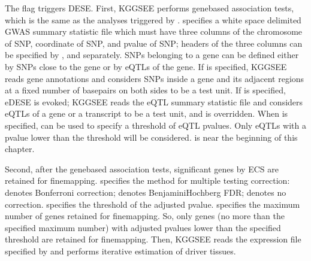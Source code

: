 \documentclass[letterpaper,10pt,english,openany,oneside]{sphinxmanual}
\begin{document}
\sphinxAtStartPar
The flag  triggers DESE. First, KGGSEE performs gene\sphinxhyphen{}based association tests, which is the same as the analyses triggered by .  specifies a white space delimited GWAS summary statistic file which must have three columns of the chromosome of SNP, coordinate of SNP, and p\sphinxhyphen{}value of SNP; headers of the three columns can be specified by ,  and  separately. SNPs belonging to a gene can be defined either by SNPs close to the gene or by eQTLs of the gene. If  is specified, KGGSEE reads gene annotations and considers SNPs inside a gene and its adjacent regions at a fixed number of basepairs on both sides to be a test unit. If  is specified, eDESE is evoked; KGGSEE reads the eQTL summary statistic file and considers eQTLs of a gene or a transcript to be a test unit, and  is overridden. When  is specified,  can be used to specify a threshold of eQTL p\sphinxhyphen{}values. Only eQTLs with a p\sphinxhyphen{}value lower than the threshold will be considered. {\hyperref[\detokenize{detailed_document:eqtl-file}]{}} is near the beginning of this chapter.

\sphinxAtStartPar
Second, after the gene\sphinxhyphen{}based association tests, significant genes by ECS are retained for fine\sphinxhyphen{}mapping.  specifies the method for multiple testing correction:  denotes Bonferroni correction;  denotes Benjamini\textendash{}Hochberg FDR;  denotes no correction.  specifies the threshold of the adjusted p\sphinxhyphen{}value.  specifies the maximum number of genes retained for fine\sphinxhyphen{}mapping. So, only genes (no more than the specified maximum number) with adjusted p\sphinxhyphen{}values lower than the specified threshold are retained for fine\sphinxhyphen{}mapping. Then, KGGSEE reads the expression file specified by  and performs iterative estimation of driver tissues.
\end{document}
